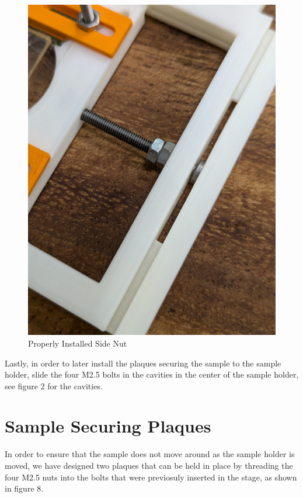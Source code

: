 \documentclass[runningheads]{llncs}
\begin{document}
\begin{figure}[h]
\begin{minipage}[b]{0.45\textwidth}
        \includegraphics[width=\textwidth]{images/side_nut.jpg} 
        \caption{Properly Installed Side Nut }
    \end{minipage}
\end{figure}

Lastly, in order to later install the plaques securing the sample to the sample holder, slide the four M2.5 bolts in the cavities in the center of the sample holder, see figure 2 for the cavities.

\section*{Sample Securing Plaques}

In order to ensure that the sample does not move around as the sample holder is moved, we have designed two plaques that can be held in place by threading the four M2.5 nuts into the bolts that were previosuly inserted in the stage, as 
shown in figure 8.
\end{document}
